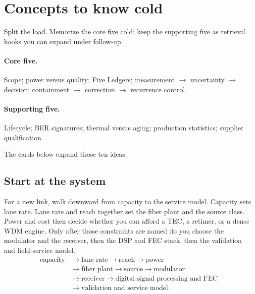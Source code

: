 \section{Concepts to know cold}
\label{sec:interview-core-concepts}

Split the load. Memorize the core five cold; keep the supporting five as
retrieval hooks you can expand under follow-up.

\paragraph{Core five.}
\label{sec:interview-core-five}
Scope; power versus quality; Five Ledgers; measurement $\rightarrow$ uncertainty
$\rightarrow$ decision; containment $\rightarrow$ correction $\rightarrow$
recurrence control.

\paragraph{Supporting five.}
\label{sec:interview-support-five}
Lifecycle; BER signatures; thermal versus aging; production statistics;
supplier qualification.

The cards below expand those ten ideas.

\subsection{Start at the system}

For a new link, walk downward from capacity to the service model. Capacity
sets lane rate. Lane rate and reach together set the fiber plant and the
source class. Power and cost then decide whether you can afford a
TEC, a retimer, or a dense WDM engine. Only after
those constraints are named do you choose the modulator and the receiver,
then the DSP and FEC stack, then the
validation and field-service model.
\[
\begin{split}
\text{capacity} &\longrightarrow \text{lane rate}
\longrightarrow \text{reach}
\longrightarrow \text{power}\\
&\longrightarrow \text{fiber plant}
\longrightarrow \text{source}
\longrightarrow \text{modulator}\\
&\longrightarrow \text{receiver}
\longrightarrow \text{digital signal processing and FEC}\\
&\longrightarrow \text{validation and service model}.
\end{split}
\]

